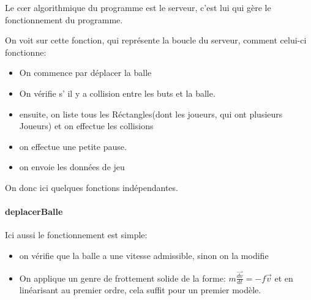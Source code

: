 \documentclass[a4paper,12pt]{report}
\begin{document}
Le c\oe{}r algorithmique du programme est le serveur, c'est lui qui gère le fonctionnement du programme. 





On voit sur cette fonction, qui représente la boucle du serveur, comment celui-ci fonctionne:

\begin{itemize}

\item On commence par déplacer la balle

\item On vérifie s’ il y a collision entre les buts et la balle.

\item ensuite, on liste tous les Réctangles(dont les joueurs, qui ont plusieurs \og{}Joueurs\fg) et on effectue les collisions

\item on effectue une petite pause.

\item on envoie les données de jeu

\end{itemize}




On donc ici quelques fonctions indépendantes.

\paragraph{deplacerBalle}






Ici aussi le fonctionnement est simple:

\begin{itemize}

\item on vérifie que la balle a une vitesse admissible, sinon on la modifie

\item On applique un genre de frottement solide de la forme: $ m \frac{\vec{dv}}{dt} = - f\vec{v} $ et en linéarisant au premier ordre, cela suffit pour un premier modèle.

\end{itemize}
\end{document}
